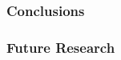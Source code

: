 \documentclass{beamer}
\begin{document}
  \begin{frame}
    \frametitle{Conclusions}
    \end{frame} 


  \begin{frame}
    \frametitle{Future Research}

    \end{frame}






    
\end{document}
